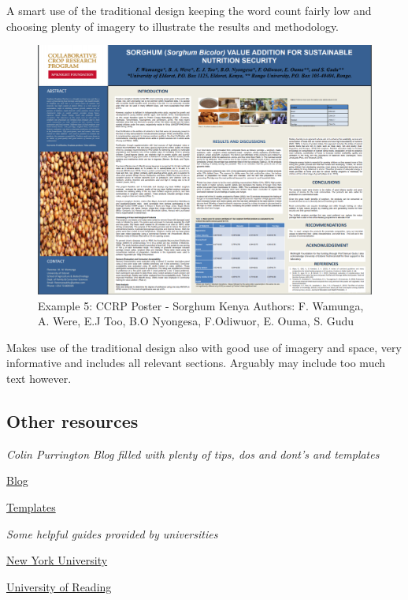 \documentclass[
]{book}
\begin{document}
A smart use of the traditional design keeping the word count fairly low and choosing plenty of imagery to illustrate the results and methodology.

\begin{figure}
\centering
\includegraphics{img/Sorghum Kenya.png}
\caption{Example 5: CCRP Poster - Sorghum Kenya Authors: F. Wamunga, A. Were, E.J Too, B.O Nyongesa, F.Odiwuor, E. Ouma, S. Gudu}
\end{figure}

Makes use of the traditional design also with good use of imagery and space, very informative and includes all relevant sections. Arguably may include too much text however.

\hypertarget{other-resources}{%
\subsection{Other resources}\label{other-resources}}

\emph{Colin Purrington Blog filled with plenty of tips, dos and dont's and templates}

\href{https://colinpurrington.com/tips/poster-design/}{Blog}

\href{https://colinpurrington.com/2019/06/templates-for-better-posters/}{Templates}

\emph{Some helpful guides provided by universities}

\href{https://guides.nyu.edu/posters}{New York University}

\href{https://www.reading.ac.uk/web/files/dps/Conference_poster_PPT_examples.pdf}{University of Reading}
\end{document}
